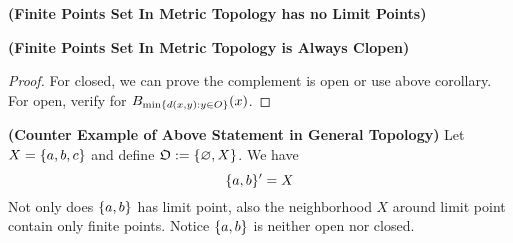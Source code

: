 \documentclass{report}
\begin{document}
\begin{corollary}
\label{2.5.7}
\textbf{(Finite Points Set In Metric Topology has no Limit Points)} 
\end{corollary}
\begin{corollary}
\label{2.5.8}
\textbf{(Finite Points Set In Metric Topology is Always Clopen)} \end{corollary}
\begin{proof}
For closed, we can prove the complement is open or use above corollary. For open, verify for $B_{\min \{ d(x,y):y \in O \}}(x)$. 
\end{proof}
\begin{theorem}
\label{2.5.9}
\textbf{(Counter Example of Above Statement in General Topology)} Let $X=\{ a,b,c \}$ and define $\mathfrak{O}:=\{ \varnothing,X \}$. We have 
\begin{equation}
\{ a,b \}'=X
\end{equation}
Not only does $\{ a,b \}$ has limit point, also the neighborhood $X$ around limit point contain only finite points. Notice $\{ a,b \}$ is neither open nor closed.
\end{theorem}
\end{document}

